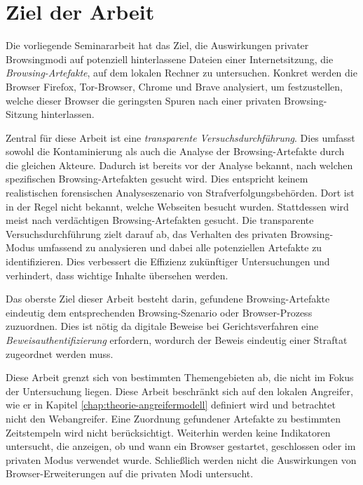 \chapter{Ziel der Arbeit}
Die vorliegende Seminararbeit hat das Ziel, die Auswirkungen privater Browsingmodi auf potenziell hinterlassene Dateien einer Internetsitzung, die \textit{Browsing-Artefakte}, auf dem lokalen Rechner zu untersuchen. Konkret werden die Browser Firefox, Tor-Browser, Chrome und Brave analysiert, um festzustellen, welche dieser Browser die geringsten Spuren nach einer privaten Browsing-Sitzung hinterlassen.

Zentral für diese Arbeit ist eine \textit{transparente Versuchsdurchführung}. Dies umfasst sowohl die Kontaminierung als auch die Analyse der Browsing-Artefakte durch die gleichen Akteure. Dadurch ist bereits vor der Analyse bekannt, nach welchen spezifischen Browsing-Artefakten gesucht wird. Dies entspricht keinem realistischen forensischen Analyseszenario von Strafverfolgungsbehörden. Dort ist in der Regel nicht bekannt, welche Webseiten besucht wurden. Stattdessen wird meist nach verdächtigen Browsing-Artefakten gesucht.
Die transparente Versuchsdurchführung zielt darauf ab, das Verhalten des privaten Browsing-Modus umfassend zu analysieren und dabei alle potenziellen Artefakte zu identifizieren. Dies verbessert die Effizienz zukünftiger Untersuchungen und verhindert, dass wichtige Inhalte übersehen werden. \cite{Horsman.2019}

Das oberste Ziel dieser Arbeit besteht darin, gefundene Browsing-Artefakte eindeutig dem entsprechenden Browsing-Szenario oder Browser-Prozess zuzuordnen. 
Dies ist nötig da digitale Beweise bei Gerichtsverfahren eine \textit{Beweisauthentifizierung} erfordern, wordurch der Beweis eindeutig einer Straftat zugeordnet werden muss.

Diese Arbeit grenzt sich von bestimmten Themengebieten ab, die nicht im Fokus der Untersuchung liegen. Diese Arbeit beschränkt sich auf den lokalen Angreifer, wie er in Kapitel \ref{chap:theorie-angreifermodell} definiert wird und betrachtet nicht den Webangreifer. Eine Zuordnung gefundener Artefakte zu bestimmten Zeitstempeln wird nicht berücksichtigt. 
Weiterhin werden keine Indikatoren untersucht, die anzeigen, ob und wann ein Browser gestartet, geschlossen oder im privaten Modus verwendet wurde.
Schließlich werden nicht die Auswirkungen von Browser-Erweiterungen auf die privaten Modi untersucht.

